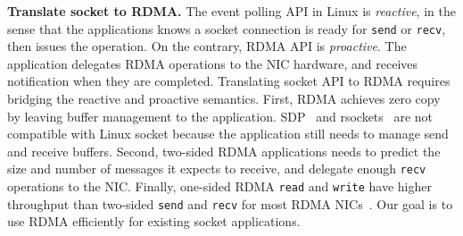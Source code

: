 \textbf{Translate socket to RDMA.}
The event polling API in Linux is \textit{reactive}, in the sense that the applications knows a socket connection is ready for \texttt{send} or \texttt{recv}, then issues the operation.
On the contrary, RDMA API is \textit{proactive}. The application delegates RDMA operations to the NIC hardware, and receives notification when they are completed.
Translating socket API to RDMA requires bridging the reactive and proactive semantics.
First, RDMA achieves zero copy by leaving buffer management to the application. SDP~\cite{socketsdirect} and rsockets~\cite{rsockets} are not compatible with Linux socket because the application still needs to manage send and receive buffers.
Second, two-sided RDMA applications needs to predict the size and number of messages it expects to receive, and delegate enough \texttt{recv} operations to the NIC.
Finally, one-sided RDMA \texttt{read} and \texttt{write} have higher throughput than two-sided \texttt{send} and \texttt{recv} for most RDMA NICs~\cite{kaminsky2016design}.
Our goal is to use RDMA efficiently for existing socket applications.
